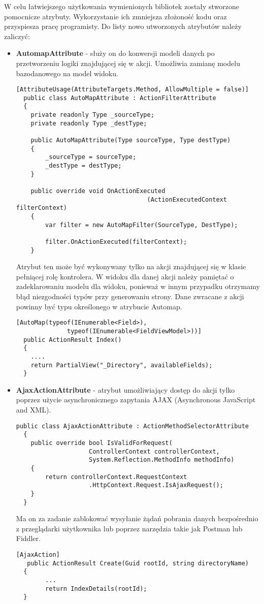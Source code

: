 W celu łatwiejszego użytkowania wymienionych bibliotek zostały stworzone pomocnicze atrybuty. Wykorzystanie ich zmniejsza złożoność kodu oraz przyspiesza pracę programisty. Do listy nowo utworzonych atrybutów należy zaliczyć:
\begin{itemize}
  \item \textbf{AutomapAttribute} - służy on do konwersji modeli danych po przetworzeniu logiki znajdującej się w akcji. Umożliwia zamianę modelu bazodanowego na model widoku.
  \\
  \begin{lstlisting}[caption=Kod atrybutu Automap]
  [AttributeUsage(AttributeTargets.Method, AllowMultiple = false)]
  public class AutoMapAttribute : ActionFilterAttribute
  {
  	private readonly Type _sourceType;
  	private readonly Type _destType;
  	
  	public AutoMapAttribute(Type sourceType, Type destType)
  	{
  		_sourceType = sourceType;
  		_destType = destType;
  	}
  	
  	public override void OnActionExecuted
  									(ActionExecutedContext filterContext)
  	{
  		var filter = new AutoMapFilter(SourceType, DestType);
  		
  		filter.OnActionExecuted(filterContext);
  	}
  \end{lstlisting}
  
  Atrybut ten może być wykonywany tylko na akcji znajdującej się w klasie pełniącej rolę kontrolera. W widoku dla danej akcji należy pamiętać o zadeklarowaniu modelu dla widoku, ponieważ w innym przypadku otrzymamy błąd niezgodności typów przy generowaniu strony. Dane zwracane z akcji powinny być typu określonego w atrybucie Automap.
  \\
  \begin{lstlisting}[caption=Wykorzystanie atrybutu AutoMap]
  [AutoMap(typeof(IEnumerable<Field>),
			  typeof(IEnumerable<FieldViewModel>))]
  public ActionResult Index()
  {
  	....
  	return PartialView("_Directory", availableFields);
  }
  \end{lstlisting}
  
  \item \textbf{AjaxActionAttribute} - atrybut umożliwiający dostęp do akcji tylko poprzez użycie asynchronicznego zapytania AJAX (Asynchronous JavaScript and XML).
   \\
  \begin{lstlisting}[caption=Kod atrybutu Automap]
  public class AjaxActionAttribute : ActionMethodSelectorAttribute
  {
  	public override bool IsValidForRequest(
				  	ControllerContext controllerContext, 
				  	System.Reflection.MethodInfo methodInfo)
  	{
  		return controllerContext.RequestContext
  					.HttpContext.Request.IsAjaxRequest();
  	}
  }
   \end{lstlisting}
  Ma on za zadanie zablokować wysyłanie żądań pobrania danych bezpośrednio z przeglądarki użytkownika lub poprzez narzędzia takie jak Postman lub Fiddler.
  \\
  \begin{lstlisting}[caption=Wykorzystanie atrybutu AjaxAction]
  [AjaxAction]
   public ActionResult Create(Guid rootId, string directoryName)
  {
 		...
  		return IndexDetails(rootId);  	
  }
  

\end{lstlisting}
\end{itemize}
